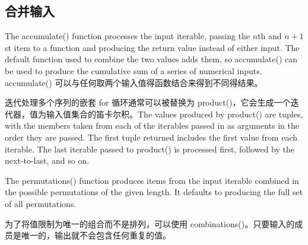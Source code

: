 \subsection{合并输入}
The accumulate() function processes the input iterable, passing the $n$th and $n+1$st item to a function and producing the return value instead of either input. The default function used to combine the two values adds them, so accumulate() can be used to produce the cumulative sum of a series of numerical inputs. accumulate() 可以与任何取两个输入值得函数结合来得到不同得结果。

迭代处理多个序列的嵌套 for 循环通常可以被替换为 product()，它会生成一个迭代器，值为输入值集合的笛卡尔积。The values produced by product() are tuples, with the members taken from each of the iterables passed in as arguments in the order they are passed. The first tuple returned includes the first value from each iterable. The last iterable passed to product() is processed first, followed by the next-to-last, and so on.

The permutations() function produces items from the input iterable combined in the possible permutations of the given length. It defaults to producing the full set of all permutations.

为了将值限制为唯一的组合而不是排列，可以使用 combinations()。只要输入的成员是唯一的，输出就不会包含任何重复的值。